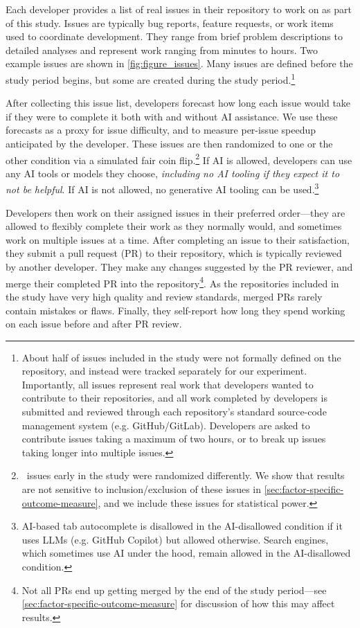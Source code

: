 \documentclass{article}
\begin{document}
Each developer provides a list of real issues in their repository to work on as part of this study. 
Issues are typically bug reports, feature requests, or work items used to coordinate development. They range from brief problem descriptions to detailed analyses and represent work ranging from minutes to hours. Two example issues are shown in \autoref{fig:figure_issues}.
Many issues are defined before the study period begins, but some are created during the study period.\footnote{About half of issues included in the study were not formally defined on the repository, and instead were tracked separately for our experiment. Importantly, all issues represent real work that developers wanted to contribute to their repositories, and all work completed by developers is submitted and reviewed through each repository's standard source-code management system (e.g. GitHub/GitLab). Developers are asked to contribute issues taking a maximum of two hours, or to break up issues taking longer into multiple issues.}

After collecting this issue list, developers forecast how long each issue would take if they were to complete it both with and without AI assistance. We use these forecasts as a proxy for issue difficulty, and to measure per-issue speedup anticipated by the developer. These issues are then randomized to one or the other condition via a simulated fair coin flip.\footnote{\NumIssuesNonCoinFlipAllInitialImplementationFinishedValid\ issues early in the study were randomized differently. We show that results are not sensitive to inclusion/exclusion of these issues in \autoref{sec:factor-specific-outcome-measure}, and we include these issues for statistical power.} If AI is allowed, developers can use any AI tools or models they choose, \textit{including no AI tooling if they expect it to not be helpful}. If AI is not allowed, no generative AI tooling can be used.\footnote{AI-based tab autocomplete is disallowed in the AI-disallowed condition if it uses LLMs (e.g. GitHub Copilot) but allowed otherwise. Search engines, which sometimes use AI under the hood, remain allowed in the AI-disallowed condition.} 

Developers then work on their assigned issues in their preferred order---they are allowed to flexibly complete their work as they normally would, and sometimes work on multiple issues at a time. After completing an issue to their satisfaction, they submit a pull request (PR) to their repository, which is typically reviewed by another developer. They make any changes suggested by the PR reviewer, and merge their completed PR into the repository\footnote{Not all PRs end up getting merged by the end of the study period---see \autoref{sec:factor-specific-outcome-measure} for discussion of how this may affect results.}. As the repositories included in the study have very high quality and review standards, merged PRs rarely contain mistakes or flaws. Finally, they self-report how long they spend working on each issue before and after PR review.
\end{document}
